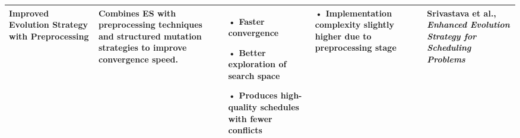 \documentclass{article}
\begin{document}
\begin{table}[htbp]
\begin{tabularx}{\textwidth}{|>{\RaggedRight\arraybackslash}p{2.5cm}|>{\RaggedRight\arraybackslash}X|>{\RaggedRight\arraybackslash}X|>{\RaggedRight\arraybackslash}X|>{\RaggedRight\arraybackslash}p{2.5cm}|}
        \textbf{Improved Evolution Strategy with Preprocessing} & 
        Combines ES with preprocessing techniques and structured mutation strategies to improve convergence speed. & 
        • Faster convergence \par • Better exploration of search space \par • Produces high-quality schedules with fewer conflicts & 
        • Implementation complexity slightly higher due to preprocessing stage & 
        Srivastava et al., \textit{Enhanced Evolution Strategy for Scheduling Problems} \\ \hline
    \end{tabularx}
\end{table}
\end{document}
